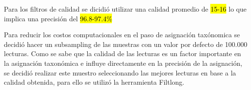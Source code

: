 

Para los filtros de calidad se dicidió utilizar una calidad promedio de \hl{15-16} lo que implica una precisión del \hl{96.8-97.4\%}














Para reducir los costos computacionales en el paso de asignación taxónomica se decidió hacer un subsampling de las muestras con un valor por defecto de 100.000 lecturas. 
Como se sabe que la calidad de las lecturas es un factor importante en la asignación taxonómica e influye directamente en la precisión de la asignación, se decidió realizar este muestro seleccionando las mejores lecturas en base a la calidad obtenida, para ello se utilizó la herramienta Filtlong.

